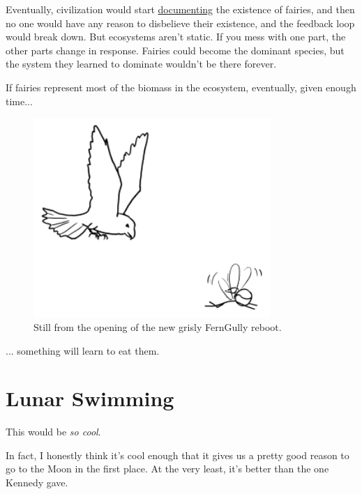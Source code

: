 {{{{Eventually, civilization would start \href{http://xkcd.com/1235/}{documenting} the existence of fairies, and then no one would have any reason to disbelieve their existence, and the feedback loop would break down.} } But ecosystems aren't static. If you mess with one part, the other parts change in response. Fairies could become the dominant species, but the system they learned to dominate wouldn't be there forever.}

{If fairies represent most of the biomass in the ecosystem, eventually, given enough time...}

\begin{figure}[!htbp]
\centering
\includegraphics[scale=0.5, max width=0.8\textwidth]{imgs/a/123/predator.png}
\caption{Still from the opening of the new grisly FernGully reboot.}
\end{figure}

{... something will learn to eat them.}

{
\chapter{Lunar Swimming}
}

\hfill{}

{This would be \emph{so cool}.}

{In fact, I honestly think it's cool enough that it gives us a pretty good reason to go to the Moon in the first place. At the very least, it's better than the one Kennedy gave.}

}
